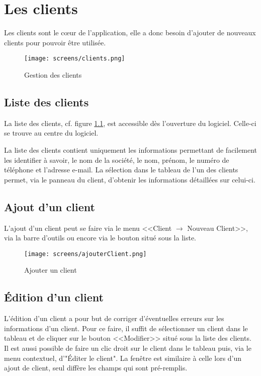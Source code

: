 \chapter{Les clients}
Les clients sont le cœur de l'application, elle a donc besoin d'ajouter de nouveaux clients pour pouvoir être utilisée. 
\begin{figure}[H]
	\centering
	\texttt{[image: screens/clients.png]}
	\caption{Gestion des clients}
	\label{fig:gestionClients}
\end{figure}

\section{Liste des clients}
La liste des clients, cf. figure \ref{fig:gestionClients}, est accessible dès l’ouverture du logiciel. Celle-ci se trouve au centre du logiciel. 

La liste des clients contient uniquement les informations permettant de facilement les identifier à savoir, le nom de la société, le nom,
prénom, le numéro de téléphone et l’adresse e-mail. La sélection dans le tableau de l’un des clients permet, via le panneau du client,
d’obtenir les informations détaillées sur celui-ci. 

\section{Ajout d'un client}
L'ajout d’un client peut se faire via le menu <<Client $\rightarrow$ Nouveau Client>>, via la barre d'outils ou encore via le bouton situé sous la
liste. 
\begin{figure}[H]
	\centering
	\texttt{[image: screens/ajouterClient.png]}
	\caption{Ajouter un client}
\end{figure}

\section{Édition d'un client}
L’édition d’un client a pour but de corriger d’éventuelles erreurs sur les informations d’un client. Pour ce faire, il suffit de sélectionner
un client dans le tableau et de cliquer sur le bouton <<Modifier>> situé sous la liste des clients. Il est aussi possible de faire un clic droit sur le client dans le tableau puis, via le menu contextuel, d'"Éditer le client".
 La fenêtre est similaire à celle lors d’un ajout de client, seul diffère les champs qui sont pré-remplis. 

